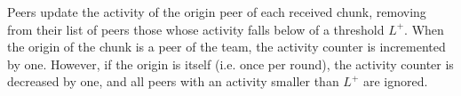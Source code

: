 

\label{sec:free_riding_control}

Peers update the \gls{activity} of the origin peer of each received
chunk, removing from their list of peers those whose activity falls
below of a threshold $L^+$. When the origin of the chunk is a peer of
the team, the activity counter is incremented by one. However, if the
origin is itself (i.e. once per round), the activity counter is
decreased by one, and all peers with an activity smaller than $L^+$
are ignored.
